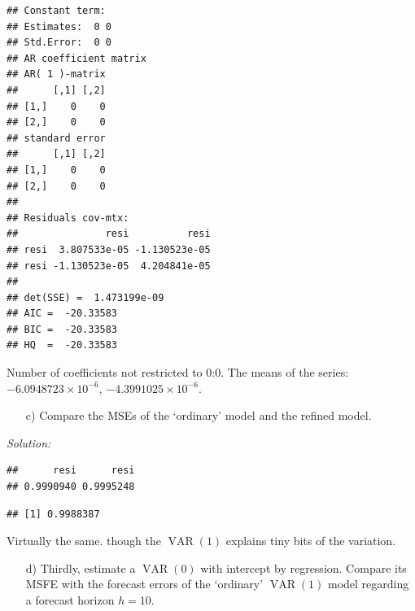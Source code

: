\documentclass[12pt,a4paper]{article}
\newcommand{\VAR}{\operatorname{VAR}} %
\newenvironment{Shaded}{\begin{snugshade}}{\end{snugshade}}
\newcommand{\KeywordTok}[1]{\textcolor[rgb]{0.13,0.29,0.53}{\textbf{#1}}}
\newcommand{\NormalTok}[1]{#1}
\newcommand{\OperatorTok}[1]{\textcolor[rgb]{0.81,0.36,0.00}{\textbf{#1}}}
\newcommand{\StringTok}[1]{\textcolor[rgb]{0.31,0.60,0.02}{#1}}
\begin{document}
\begin{verbatim}
## Constant term: 
## Estimates:  0 0 
## Std.Error:  0 0 
## AR coefficient matrix 
## AR( 1 )-matrix 
##      [,1] [,2]
## [1,]    0    0
## [2,]    0    0
## standard error 
##      [,1] [,2]
## [1,]    0    0
## [2,]    0    0
##   
## Residuals cov-mtx: 
##               resi          resi
## resi  3.807533e-05 -1.130523e-05
## resi -1.130523e-05  4.204841e-05
##   
## det(SSE) =  1.473199e-09 
## AIC =  -20.33583 
## BIC =  -20.33583 
## HQ  =  -20.33583
\end{verbatim}

Number of coefficients not restricted to 0:0. The means of the series:
\ensuremath{-6.0948723\times 10^{-6}},
\ensuremath{-4.3991025\times 10^{-6}}.

\begin{itemize}
  \item[c)] Compare the MSEs of the ‘ordinary’ model and the refined model.
\end{itemize}

\emph{Solution:}

\begin{Shaded}
\end{Shaded}

\begin{verbatim}
##      resi      resi 
## 0.9990940 0.9995248
\end{verbatim}

\begin{Shaded}
\end{Shaded}

\begin{verbatim}
## [1] 0.9988387
\end{verbatim}

Virtually the same. though the \(\VAR(1)\) explains tiny bits of the
variation.

\begin{itemize}
  \item[d)] Thirdly, estimate a $\VAR(0)$ with intercept by regression. Compare its MSFE with the forecast errors of the ‘ordinary’ $\VAR(1)$ model regarding a forecast horizon $h = 10$.
\end{itemize}
\end{document}
